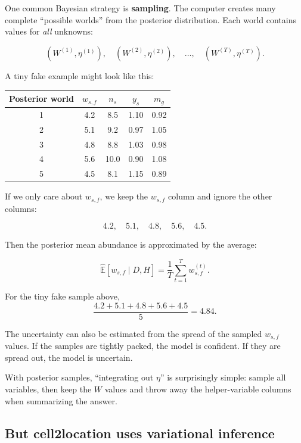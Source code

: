 \documentclass[11pt]{article}
\newcommand{\E}{\mathbb{E}}
\newcommand{\term}[1]{\textbf{#1}}
\begin{document}
One common Bayesian strategy is \term{sampling}. The computer creates many complete ``possible worlds'' from the posterior distribution. Each world contains values for \emph{all} unknowns:

\[
(W^{(1)},\eta^{(1)}),\quad (W^{(2)},\eta^{(2)}),\quad \ldots,\quad (W^{(T)},\eta^{(T)}).
\]

A tiny fake example might look like this:

\begin{center}
\begin{tabular}{ccccc}
\toprule
Posterior world & $w_{s,f}$ & $n_s$ & $y_s$ & $m_g$ \\
\midrule
1 & 4.2 & 8.5 & 1.10 & 0.92 \\
2 & 5.1 & 9.2 & 0.97 & 1.05 \\
3 & 4.8 & 8.8 & 1.03 & 0.98 \\
4 & 5.6 & 10.0 & 0.90 & 1.08 \\
5 & 4.5 & 8.1 & 1.15 & 0.89 \\
\bottomrule
\end{tabular}
\end{center}

If we only care about $w_{s,f}$, we keep the $w_{s,f}$ column and ignore the other columns:

\[
4.2,\quad 5.1,\quad 4.8,\quad 5.6,\quad 4.5.
\]

Then the posterior mean abundance is approximated by the average:

\begin{mathbox}
\[
\widehat{\E}[w_{s,f}\mid D,H]
=
\frac{1}{T}\sum_{t=1}^{T} w_{s,f}^{(t)}.
\]
\end{mathbox}

For the tiny fake sample above,
\[
\frac{4.2+5.1+4.8+5.6+4.5}{5}=4.84.
\]

The uncertainty can also be estimated from the spread of the sampled $w_{s,f}$ values. If the samples are tightly packed, the model is confident. If they are spread out, the model is uncertain.

\begin{bigidea}
With posterior samples, ``integrating out $\eta$'' is surprisingly simple: sample all variables, then keep the $W$ values and throw away the helper-variable columns when summarizing the answer.
\end{bigidea}

\subsection{But cell2location uses variational inference}
\end{document}
